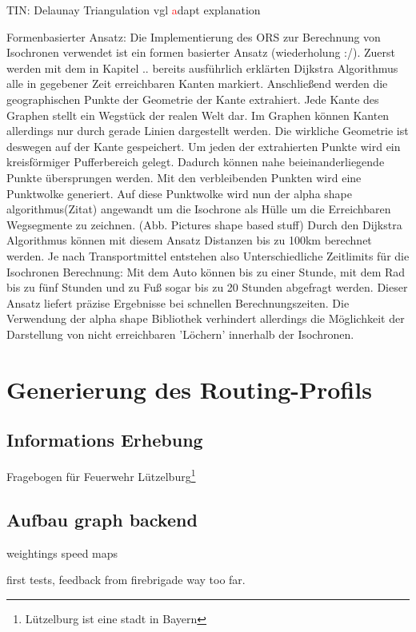 \documentclass[10pt,a4paper]{article}
\newcommand\todo[1]{\textcolor{red}{#1}}
\begin{document}
TIN: Delaunay Triangulation
vgl \cite{isos}
\todo adapt explanation


Formenbasierter Ansatz:
Die Implementierung des ORS zur Berechnung von Isochronen verwendet ist ein formen basierter Ansatz (wiederholung :/). Zuerst werden mit dem in Kapitel .. bereits ausführlich erklärten Dijkstra Algorithmus alle in gegebener Zeit erreichbaren Kanten markiert. Anschließend werden die geographischen Punkte der Geometrie der Kante extrahiert. Jede Kante des Graphen stellt ein Wegstück der realen Welt dar. Im Graphen können Kanten allerdings nur durch gerade Linien dargestellt werden. Die wirkliche Geometrie ist deswegen auf der Kante gespeichert. Um jeden der extrahierten Punkte wird ein kreisförmiger Pufferbereich gelegt. Dadurch können nahe beieinanderliegende Punkte übersprungen werden. Mit den verbleibenden Punkten wird eine Punktwolke generiert. Auf diese Punktwolke wird nun der alpha shape algorithmus(Zitat) angewandt um die Isochrone als Hülle um die Erreichbaren Wegsegmente zu zeichnen.
(Abb. Pictures shape based stuff)
Durch den Dijkstra Algorithmus können mit diesem Ansatz Distanzen bis zu 100km berechnet werden. Je nach Transportmittel entstehen also Unterschiedliche Zeitlimits für die Isochronen Berechnung: Mit dem Auto können bis zu einer Stunde, mit dem Rad bis zu fünf Stunden und zu Fuß sogar bis zu 20 Stunden abgefragt werden. Dieser Ansatz liefert präzise Ergebnisse bei schnellen Berechnungszeiten. Die Verwendung der alpha shape Bibliothek verhindert allerdings die Möglichkeit der Darstellung von nicht erreichbaren 'Löchern' innerhalb der Isochronen.


\section{Generierung des Routing-Profils}

\subsection{Informations Erhebung}
Fragebogen für Feuerwehr Lützelburg\footnote{Lützelburg ist eine stadt in Bayern}

\subsection{Aufbau graph backend}

weightings 
speed maps

first tests, feedback from firebrigade
way too far.
\end{document}
